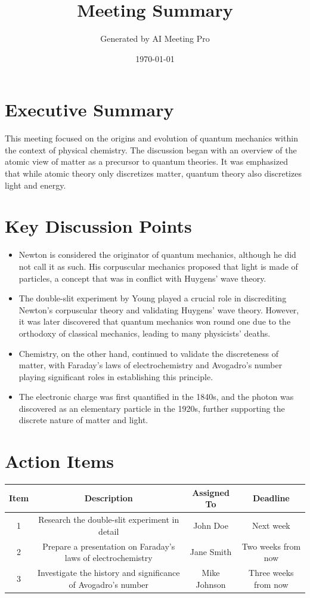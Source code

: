 \documentclass{article}
\title{Meeting Summary}
\author{Generated by AI Meeting Pro}
\date{\today}
\begin{document}
\maketitle
\section*{Executive Summary}
This meeting focused on the origins and evolution of quantum mechanics within the context of physical chemistry. The discussion began with an overview of the atomic view of matter as a precursor to quantum theories. It was emphasized that while atomic theory only discretizes matter, quantum theory also discretizes light and energy.

\section*{Key Discussion Points}
\begin{itemize}
    \item Newton is considered the originator of quantum mechanics, although he did not call it as such. His corpuscular mechanics proposed that light is made of particles, a concept that was in conflict with Huygens' wave theory.
    \item The double-slit experiment by Young played a crucial role in discrediting Newton's corpuscular theory and validating Huygens' wave theory. However, it was later discovered that quantum mechanics won round one due to the orthodoxy of classical mechanics, leading to many physicists' deaths.
    \item Chemistry, on the other hand, continued to validate the discreteness of matter, with Faraday's laws of electrochemistry and Avogadro's number playing significant roles in establishing this principle.
    \item The electronic charge was first quantified in the 1840s, and the photon was discovered as an elementary particle in the 1920s, further supporting the discrete nature of matter and light.
\end{itemize}

\section*{Action Items}
\begin{tabular}{|c|c|c|c|}
    \hline
    Item & Description & Assigned To & Deadline \\
    \hline
    1 & Research the double-slit experiment in detail & John Doe & Next week \\
    \hline
    2 & Prepare a presentation on Faraday's laws of electrochemistry & Jane Smith & Two weeks from now \\
    \hline
    3 & Investigate the history and significance of Avogadro's number & Mike Johnson & Three weeks from now \\
    \hline
\end{tabular}
\end{document}
